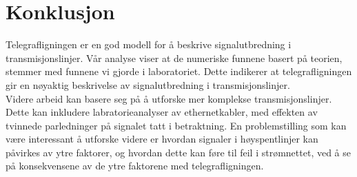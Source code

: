 \section{Konklusjon}
Telegrafligningen er en god modell for å beskrive signalutbredning i transmisjonslinjer. Vår analyse viser at de numeriske funnene basert på teorien, stemmer med funnene vi gjorde i laboratoriet. Dette indikerer at telegrafligningen gir en nøyaktig beskrivelse av signalutbredning i transmisjonslinjer.
\\[1em]
Videre arbeid kan basere seg på å utforske mer komplekse transmisjonslinjer. Dette kan inkludere labratorieanalyser av ethernetkabler, med effekten av tvinnede parledninger på signalet tatt i betraktning.
En problemstilling som kan være interessant å utforske videre er hvordan signaler i høyspentlinjer kan påvirkes av ytre faktorer, og hvordan dette kan føre til feil i strømnettet, ved å se på konsekvensene av de ytre faktorene med telegrafligningen.